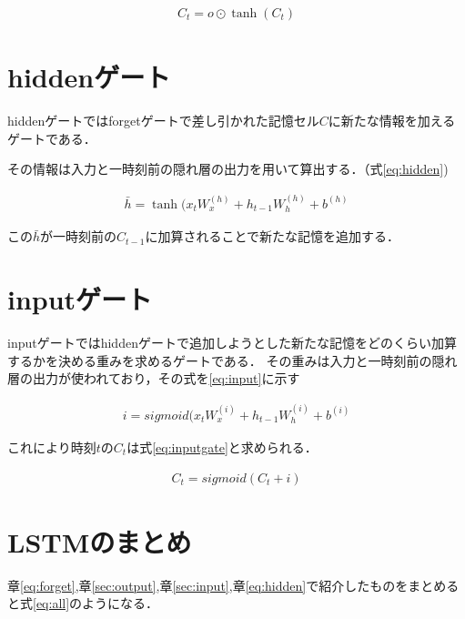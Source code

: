 \documentclass[a4j,11pt,report]{jsbook}
\begin{document}
\begin{equation}
  \label{eq:outputgate}
  \begin{split}
    C_{t} = o \odot \tanh(C_{t})
  \end{split}
\end{equation}

\section{hiddenゲート\label{sec:hidden}}

hiddenゲートではforgetゲートで差し引かれた記憶セル$C$に新たな情報を加えるゲートである．

その情報は入力と一時刻前の隠れ層の出力を用いて算出する．（式\ref{eq:hidden})


\begin{equation}
  \label{eq:hidden}
  \begin{split}
    \bar{h} = \tanh(x_{t}W_{x}^{(h)} + h_{t-1}W_{h}^{(h)} + b^{(h)}
  \end{split}
\end{equation}

この$\bar{h}$が一時刻前の$C_{t-1}$に加算されることで新たな記憶を追加する．


\section{inputゲート\label{sec:input}}

inputゲートではhiddenゲートで追加しようとした新たな記憶をどのくらい加算するかを決める重みを求めるゲートである．
その重みは入力と一時刻前の隠れ層の出力が使われており，その式を\ref{eq:input}に示す


\begin{equation}
  \label{eq:input}
  \begin{split}
    i = sigmoid(x_{t}W_{x}^{(i)} + h_{t-1}W_{h}^{(i)} + b^{(i)}
  \end{split}
\end{equation}

これにより時刻$t$の$C_{t}$は式\ref{eq:inputgate}と求められる．

\begin{equation}
  \label{eq:inputgate}
  \begin{split}
    C_{t} = sigmoid (C_{t} + i )
  \end{split}
\end{equation}

\section{LSTMのまとめ}
章\ref{eq:forget},章\ref{sec:output},章\ref{sec:input},章\ref{eq:hidden}で紹介したものをまとめると式\ref{eq:all}のようになる．
\end{document}
